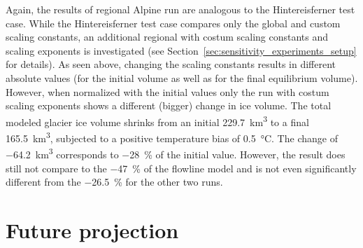     Again, the results of regional Alpine run are analogous to the Hintereisferner test case. While the Hintereisferner test case compares only the global and custom scaling constants, an additional regional with costum scaling constants and scaling exponents is investigated (see Section~\ref{sec:sensitivity_experiments_setup} for details). As seen above, changing the scaling constants results in different absolute values (for the initial volume as well as for the final equilibrium volume). However, when normalized with the initial values only the run with costum scaling exponents shows a different (bigger) change in ice volume. The total modeled glacier ice volume shrinks from an initial \SI{229.7}{\cubic\kilo\meter} to a final \SI{165.5}{\cubic\kilo\meter}, subjected to a positive temperature bias of \SI{+0.5}{\celsius}. The change of \SI{-64.2}{\cubic\kilo\meter} corresponds to \SI{-28}{\percent} of the initial value. However, the result does still not compare to the \SI{-47}{\percent} of the flowline model and is not even significantly different from the \SI{-26.5}{\percent} for the other two \vas{} runs.



\section{Future projection} %
\label{sec:future_projection_results}





